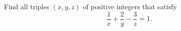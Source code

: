 Find all triples $(x,y,z)$ of positive integers that satisfy
\[
\dfrac{1}{x}+\dfrac{2}{y}-\dfrac{3}{z}=1 .
\]
